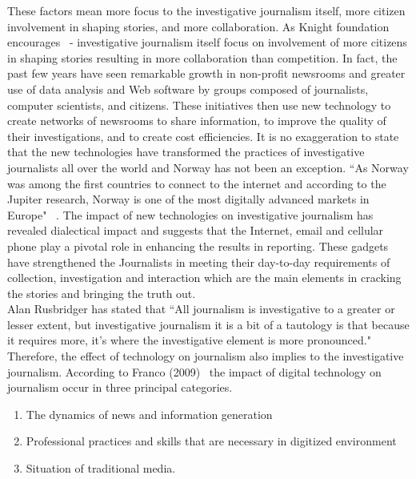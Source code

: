  These factors mean more focus to the investigative journalism itself, more citizen involvement in shaping stories, and more collaboration. As Knight foundation encourages~\cite{3media2014} - investigative journalism itself focus on involvement of more citizens in shaping stories resulting in more collaboration than competition. In fact, the past few years have seen remarkable growth in non-profit newsrooms and greater use of data analysis and Web software by groups composed of journalists, computer scientists, and citizens. These initiatives then use new technology to create networks of newsrooms to share information, to improve the quality of their investigations, and to create cost efficiencies. It is no exaggeration to state that the new technologies have transformed the practices of investigative journalists all over the world and Norway has not been an exception. ``As Norway was among the first countries to connect to the internet and according to the Jupiter research, Norway is one of the most digitally advanced markets in Europe" ~\cite{ottosen2012digital}. The impact of new technologies on investigative journalism has revealed dialectical impact and suggests that the Internet, email and cellular phone play a pivotal role in enhancing the results in reporting.  These gadgets have strengthened the Journalists in meeting their day-to-day requirements of collection, investigation and interaction which are the main elements in cracking the stories and bringing the truth out.\\
 
 Alan Rusbridger has stated that ``All journalism is investigative to a greater or lesser extent, but investigative journalism it is a bit of a tautology is that because it requires more, it's where the investigative element is more pronounced." ~\cite[p.17]{de2008investigative}  Therefore, the effect of technology on journalism also implies to the investigative journalism. According to Franco (2009)~\cite{gf9} the impact of digital technology on journalism occur in three principal categories.
 \begin{enumerate}
 	
 	\item The dynamics of news and information generation
 	
 	\item Professional practices and skills that are necessary in digitized environment
 	
 	\item Situation of traditional media.
 	
 \end{enumerate}

